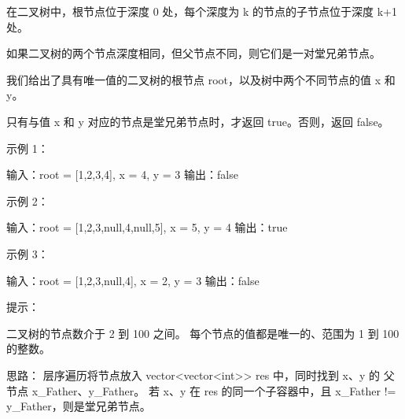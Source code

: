 在二叉树中，根节点位于深度 0 处，每个深度为 k 的节点的子节点位于深度 k+1 处。

如果二叉树的两个节点深度相同，但父节点不同，则它们是一对堂兄弟节点。

我们给出了具有唯一值的二叉树的根节点 root，以及树中两个不同节点的值 x 和 y。

只有与值 x 和 y 对应的节点是堂兄弟节点时，才返回 true。否则，返回 false。

 

示例 1：

输入：root = [1,2,3,4], x = 4, y = 3
输出：false

示例 2：

输入：root = [1,2,3,null,4,null,5], x = 5, y = 4
输出：true

示例 3：

输入：root = [1,2,3,null,4], x = 2, y = 3
输出：false

 

提示：

    二叉树的节点数介于 2 到 100 之间。
    每个节点的值都是唯一的、范围为 1 到 100 的整数。





















思路：
层序遍历将节点放入 vector<vector<int>> res 中，同时找到 x、y 的 父节点 x_Father、y_Father。
若 x、y 在 res 的同一个子容器中，且 x_Father != y_Father，则是堂兄弟节点。





















